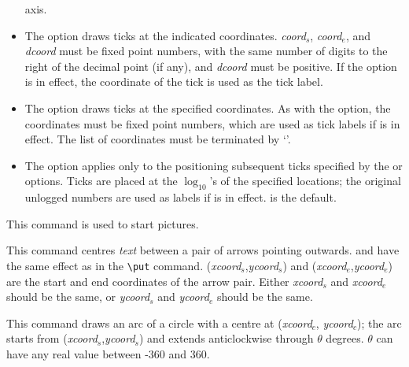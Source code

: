 \begin{syntax}
\begin{itemize}
axis.
\item
The  option draws ticks at the indicated coordinates. \emph{coord}$_s$,
\emph{coord}$_e$, and \emph{dcoord} must be fixed point numbers, with the same number of
digits to the right of the decimal point (if any), and \emph{dcoord} must be
positive. If the  option is in effect, the coordinate of the
tick is used as the tick label.
\item
The  option draws ticks at the specified coordinates. As with the
 option, the coordinates must be fixed point numbers, which are
used as tick labels if  is in effect. The list of coordinates
must be terminated by `\type{/}'.
\item
The  option applies only to the positioning subsequent ticks
specified by the  or  options. Ticks are placed at the
$\log_{10}$'s of the specified locations; the original unlogged numbers are used
as labels if  is in effect.  is the default.
\end{itemize}
\item[\tt\bsl beginpicture]
This command is used to start \PiCTeX{} pictures.
\item[{\tt\bsl betweenarrows \{\emph{text}\} {\rm[}[{\rm[}$o_x${\rm]}{\rm[}$o_y${\rm]}]{\rm]}
{\rm[}<\emph{xshift},\emph{yshift}>{\rm]} from \emph{xcoord}$_s$ \emph{ycoord}$_s$ to \emph{xcoord}$_e$
\emph{ycoord}$_e$}]
\begin{sloppypar}
This command centres \emph{text} between a pair of arrows pointing outwards.
 and \type{[{\rm[}$o_x${\rm]}{\rm[}$o_y${\rm]}]}
have the same effect as in the \verb+\put+ command.
(\emph{xcoord}$_s$,\emph{ycoord}$_s$) and (\emph{xcoord}$_e$,\emph{ycoord}$_e$) are the start and end
coordinates of the arrow pair.
Either \emph{xcoord}$_s$ and \emph{xcoord}$_e$ should be the
same, or  \emph{ycoord}$_s$ and \emph{ycoord}$_e$ should be the same.
\end{sloppypar}
\item[\tt\bsl circulararc $\theta$ degrees from \emph{xcoord}$_s$ \emph{ycoord}$_s$ center
at \emph{xcoord}$_c$ \emph{ycoord}$_c$]
This command draws an arc of a circle with a centre at  (\emph{xcoord}$_c$,
\emph{ycoord}$_c$); the arc starts from (\emph{xcoord}$_s$,\emph{ycoord}$_s$) and extends
anticlockwise through $\theta$ degrees. $\theta$ can have any real value
between -360 and 360.
\item[\tt\bsl Divide <\emph{dividend}> by <\emph{divisor}> forming <\emph{quotient}>]

\end{syntax}
